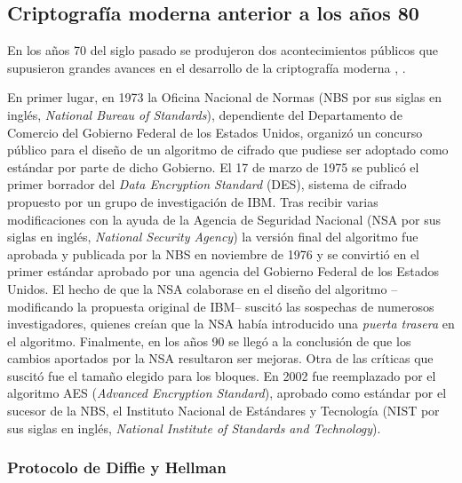 \documentclass[
  a4paper,
  12pt,
  spanish,
]{scrartcl}
\begin{document}
\subsection{Criptografía moderna anterior a los años 80}



En los años 70 del siglo pasado se produjeron dos acontecimientos públicos que supusieron grandes avances en el desarrollo de la criptografía moderna \parencite{singh_code_2003}, \parencite{thawte_history_2013}.

En primer lugar, en 1973 la Oficina Nacional de Normas (NBS por sus siglas en inglés, \textit{National Bureau of Standards}), dependiente del Departamento de Comercio del Gobierno Federal de los Estados Unidos, organizó un concurso público para el diseño de un algoritmo de cifrado que pudiese ser adoptado como estándar por parte de dicho Gobierno. 
El 17 de marzo de 1975 se publicó el primer borrador del \textit{Data Encryption Standard} (DES), sistema de cifrado propuesto por un grupo de investigación de IBM.
Tras recibir varias modificaciones con la ayuda de la Agencia de Seguridad Nacional (NSA por sus siglas en inglés, \textit{National Security Agency}) la versión final del algoritmo fue aprobada y publicada por la NBS en noviembre de 1976 y se convirtió en el primer estándar aprobado por una agencia del Gobierno Federal de los Estados Unidos. 
El hecho de que la NSA colaborase en el diseño del algoritmo --modificando la propuesta original de IBM-- suscitó las sospechas de numerosos investigadores, quienes creían que la NSA había introducido una \textit{puerta trasera} en el algoritmo. 
Finalmente, en los años 90 se llegó a la conclusión de que los cambios aportados por la NSA resultaron ser mejoras. %
Otra de las críticas que suscitó fue el tamaño elegido para los bloques.
En 2002 fue reemplazado por el algoritmo AES (\textit{Advanced Encryption Standard}), aprobado como estándar por el sucesor de la NBS, el Instituto Nacional de Estándares y Tecnología (NIST por sus siglas en inglés, \textit{National Institute of Standards and Technology}).

\subsubsection{Protocolo de Diffie y Hellman}
\end{document}
